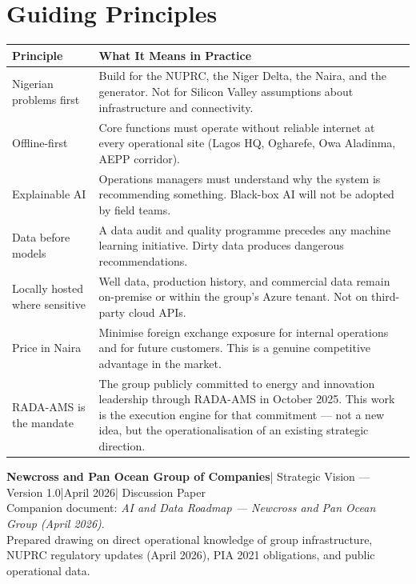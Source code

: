 \documentclass[10pt]{article}
\begin{document}
\vspace{10pt}

\section{Guiding Principles}

\small
\begin{tabularx}{\columnwidth}{@{}lX@{}}
\toprule
\textbf{Principle} & \textbf{What It Means in Practice} \\
\midrule
Nigerian problems first
  & Build for the NUPRC, the Niger Delta, the Naira, and the generator.
    Not for Silicon Valley assumptions about infrastructure and connectivity. \\[3pt]
Offline-first
  & Core functions must operate without reliable internet at every
    operational site (Lagos HQ, Ogharefe, Owa Aladinma, AEPP corridor). \\[3pt]
Explainable AI
  & Operations managers must understand why the system is recommending
    something. Black-box AI will not be adopted by field teams. \\[3pt]
Data before models
  & A data audit and quality programme precedes any machine learning
    initiative. Dirty data produces dangerous recommendations. \\[3pt]
Locally hosted where sensitive
  & Well data, production history, and commercial data remain on-premise
    or within the group's Azure tenant. Not on third-party cloud APIs. \\[3pt]
Price in Naira
  & Minimise foreign exchange exposure for internal operations and for
    future customers. This is a genuine competitive advantage in the market. \\[3pt]
RADA-AMS is the mandate
  & The group publicly committed to energy and innovation leadership through
    RADA-AMS in October 2025. This work is the execution engine for that
    commitment --- not a new idea, but the operationalisation of an
    existing strategic direction. \\
\bottomrule
\end{tabularx}
\normalsize

\vspace{10pt}

\vspace{6pt}
{\small\color{darkgrey}
\textbf{Newcross and Pan Ocean Group of Companies}\enspace|\enspace
Strategic Vision --- Version 1.0\enspace|\enspace April 2026\enspace|\enspace
Discussion Paper\\
Companion document: \textit{AI and Data Roadmap --- Newcross and Pan Ocean Group
(April 2026)}.\\
Prepared drawing on direct operational knowledge of group infrastructure,
NUPRC regulatory updates (April 2026), PIA 2021 obligations, and public
operational data.
}
\end{document}

